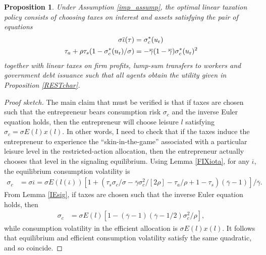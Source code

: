\documentclass[11pt]{article}
\theoremstyle{plain}
\newtheorem{prop}[thm]{Proposition}
\begin{document}
\begin{prop}\label{linTAXmain}
Under Assumption \ref{imp_assump}, the optimal linear taxation policy consists of choosing taxes on interest and assets satisfying the pair of equations
\begin{align*}
\sigma \overline{\iota}(\tau) & = \sigma_c^*(u_{\textnormal{r}})
\\ \tau_a + \rho\tau_s(1 - \sigma_c^*(u_{\textnormal{r}})/\sigma) & = -\overline{\gamma}(1-\overline{\gamma}) \sigma_c^*(u_{\textnormal{r}})^2
\end{align*}
together with linear taxes on firm profits, lump-sum transfers to workers and government debt issuance such that all agents obtain the utility given in Proposition \ref{RESTchar}. 
\end{prop}


\begin{proof}[Proof sketch]
The main claim that must be verified is that if taxes are chosen such that the entrepreneur bears consumption risk $\sigma_c$ and the inverse Euler equation holds, then the entrepreneur will choose leisure $l$ satisfying $\sigma_c = \sigma E(l) x(l)$. In other words, I need to check that if the taxes induce the entrepreneur to experience the ``skin-in-the-game'' associated with a particular leisure level in the restricted-action allocation, then the entrepreneur actually chooses that level in the signaling equilibrium. Using Lemma \ref{FIXiota}, for any $\overline{\iota}$, the equilibrium consumption volatility is
\begin{align*}
\sigma_c & = \sigma \overline{\iota}  = \sigma E(l(\overline{\iota}))[1 + {\left(\tau_s\sigma_c/\sigma - \overline{\gamma}\sigma_c^2/[2\rho] - \tau_a/\rho + 1-\tau_s\right)}(\overline{\gamma}-1)]/\overline{\gamma}.
\end{align*}
From Lemma \ref{IEsig}, if taxes are chosen such that the inverse Euler equation holds, then
\begin{align*}
\sigma_c & %
 = \sigma E(l) {\left[ 1 - (\overline{\gamma} - 1)(\overline{\gamma} - 1/2)\sigma_c^2/\rho\right]},
\end{align*}
while consumption volatility in the efficient allocation is $\sigma E(l)x(l)$. It follows that equilibrium and efficient consumption volatility satisfy the same quadratic, and so coincide. 
\end{proof}
\end{document}
